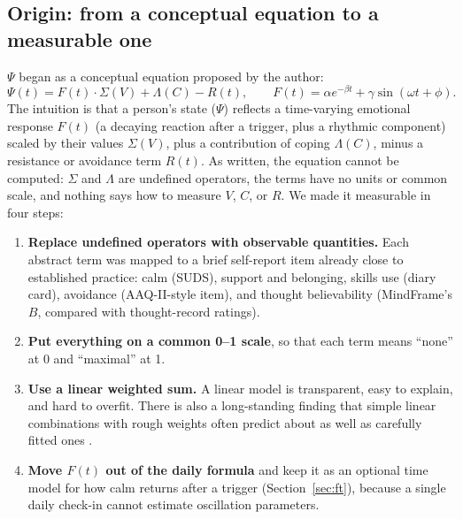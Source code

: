 \documentclass[11pt]{article}
\begin{document}
\subsection{Origin: from a conceptual equation to a measurable one}
$\Psi$ began as a conceptual equation proposed by the author:
\begin{equation}
\Psi(t) = F(t)\cdot \Sigma(V) + \Lambda(C) - R(t), \qquad F(t) = \alpha e^{-\beta t} + \gamma \sin(\omega t + \phi).
\label{eq:concept}
\end{equation}
The intuition is that a person's state ($\Psi$) reflects a time-varying emotional response $F(t)$ (a decaying reaction after a trigger, plus a rhythmic component) scaled by their values $\Sigma(V)$, plus a contribution of coping $\Lambda(C)$, minus a resistance or avoidance term $R(t)$. As written, the equation cannot be computed: $\Sigma$ and $\Lambda$ are undefined operators, the terms have no units or common scale, and nothing says how to measure $V$, $C$, or $R$. We made it measurable in four steps:
\begin{enumerate}
\item \textbf{Replace undefined operators with observable quantities.} Each abstract term was mapped to a brief self-report item already close to established practice: calm (SUDS), support and belonging, skills use (diary card), avoidance (AAQ-II-style item), and thought believability (MindFrame's $B$, compared with thought-record ratings).
\item \textbf{Put everything on a common 0--1 scale}, so that each term means ``none'' at 0 and ``maximal'' at 1.
\item \textbf{Use a linear weighted sum.} A linear model is transparent, easy to explain, and hard to overfit. There is also a long-standing finding that simple linear combinations with rough weights often predict about as well as carefully fitted ones \citep{dawes1979}.
\item \textbf{Move $F(t)$ out of the daily formula} and keep it as an optional time model for how calm returns after a trigger (Section~\ref{sec:ft}), because a single daily check-in cannot estimate oscillation parameters.
\end{enumerate}
\end{document}
